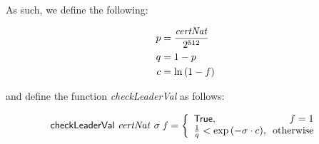 As such, we define the following:

\begin{align*}
  p & = \frac{\mathit{certNat}}{2^{512}} \\
  q & = 1 - p \\
  c & = \ln{(1 - f)}
\end{align*}

and define the function \textit{checkLeaderVal} as follows:

\begin{equation*}
  \fun{checkLeaderVal}~\var{certNat}~\sigma~\var{f} =
    \left\{
      \begin{array}{l@{~}r}
        \mathsf{True}, & f = 1 \\
        \frac{1}{q} < \exp{(-\sigma \cdot c)}, & \text{ otherwise}
      \end{array}
    \right.
\end{equation*}
